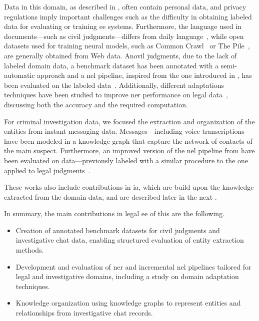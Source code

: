 Data in this domain, as described in , often contain personal data, and privacy regulations imply important challenges such as the difficulty in obtaining labeled data for evaluating or training \ac{ee} systems. Furthermore, the language used in documents---such as civil judgments---differs from daily language~\cite{ccetindaug2023name_legal_turkish}, while open datasets used for training neural models, such as Common Crawl~\cite{commoncrawl} or The Pile~\cite{gao2020pile800gbdatasetdiverse}, are generally obtained from Web data. Anovil judgments, due to the lack of labeled domain data, a benchmark dataset has been annotated with a semi-automatic approach and a \ac{nel} pipeline, inspired from the one introduced in , has been evaluated on the labeled data~\cite{BELLANDI2024}. Additionally, different adaptations techniques have been studied to improve \ac{ner} performance on legal data~\cite{aixia_2023}, discussing both the accuracy and the required computation.

For criminal investigation data, we focused the extraction and organization of the entities from instant messaging data. Messages---including voice transcriptions---have been modeled in a knowledge graph that capture the network of contacts of the main suspect. Furthermore, an improved version of the \ac{nel} pipeline from  have been evaluated on data---previously labeled with a similar procedure to the one applied to legal judgments~\cite{pozzi_wise_2025}.

These works also include contributions in \acl{ia}, which are build upon the knowledge extracted from the domain data, and are described later in the next .

In summary, the main contributions in legal \ac{ee} of this \phd are the following.
\begin{itemize}
    \item Creation of annotated benchmark datasets for civil judgments and investigative chat data, enabling structured evaluation of entity extraction methods.
    \item Development and evaluation of \ac{ner} and incremental \ac{nel} pipelines tailored for legal and investigative domains, including a study on domain adaptation techniques.
    \item Knowledge organization using knowledge graphs to represent entities and relationships from investigative chat records.
\end{itemize}

